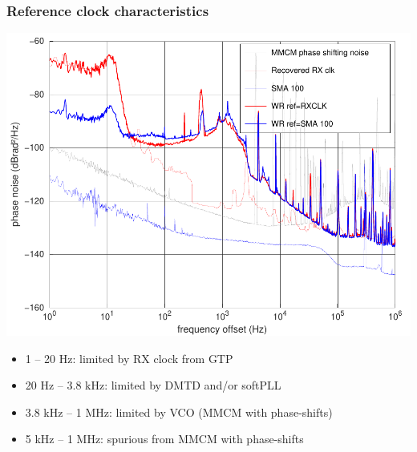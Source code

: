 \documentclass[compress,10pt,aspectratio=169]{beamer}
\begin{document}
\begin{frame}[fragile]\frametitle{Reference clock characteristics}

\begin{minipage}[t]{\linewidth}
\begin{minipage}{.49\linewidth}
\includegraphics[width=\linewidth]{phase_noise.pdf}
\end{minipage}
\begin{minipage}{.54\linewidth}

\vspace{0.4cm}

  \begin{itemize}
    \item 1 -- 20 Hz: limited by RX clock from GTP
    \item 20 Hz -- 3.8 kHz: limited by DMTD and/or softPLL
    \item 3.8 kHz -- 1 MHz: limited by VCO (MMCM with phase-shifts)
    \item 5 kHz -- 1 MHz: spurious from MMCM with phase-shifts
  \end{itemize}
\end{minipage}
\end{minipage}
\end{frame}
\end{document}
